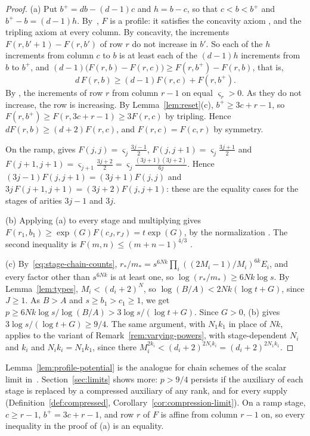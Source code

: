 \begin{proof}
(a) Put \(b^+=db-(d-1)c\) and \(h=b-c\), so that \(c<b<b^+\) and
\(b^+-b=(d-1)h\). By~\citep[Theorem~3.2]{FinCon26}, \(F\) is a profile:
it satisfies the concavity axiom \citep[(3.2)]{FinCon26}, and the
tripling axiom \citep[(3.3)]{FinCon26} at every column. By
concavity, the increments \(F(r,b'+1)-F(r,b')\) of row \(r\) do not
increase in \(b'\). So each of the \(h\) increments from column \(c\) to
\(b\) is at least each of the \((d-1)h\) increments from \(b\) to
\(b^+\), and \((d-1)\bigl(F(r,b)-F(r,c)\bigr)\ge F(r,b^+)-F(r,b)\), that
is,
\[
 d\,F(r,b)\ge(d-1)F(r,c)+F(r,b^+).
\]
By \citep[(3.5)]{FinCon26}, the increments of row \(r\) from column
\(r-1\) on equal \(\varsigma_r>0\). As they do not increase, the row is
increasing. By Lemma~\ref{lem:reset}(c), \(b^+\ge3c+r-1\), so
\(F(r,b^+)\ge F(r,3c+r-1)\ge3F(r,c)\) by tripling. Hence
\(dF(r,b)\ge(d+2)F(r,c)\), and \(F(r,c)=F(c,r)\) by symmetry.

On the ramp, \citep[(3.4)]{FinCon26} gives
\(F(j,j)=\varsigma_j\frac{3j-1}2\), \(F(j,j+1)=\varsigma_j\frac{3j+1}2\) and
\(F(j+1,j+1)=\varsigma_{j+1}\frac{3j+2}2=\varsigma_j\frac{(3j+1)(3j+2)}{6j}\).
Hence \((3j-1)F(j,j+1)=(3j+1)F(j,j)\) and
\(3j\,F(j+1,j+1)=(3j+2)F(j,j+1)\): these are the equality cases for the
stages of arities \(3j-1\) and \(3j\).

(b) Applying (a) to every stage and multiplying gives
\(F(r_1,b_1)\ge\exp(G)F(c_J,r_J)=t\exp(G)\), by the normalization
\citep[(3.1)]{FinCon26}. The second inequality is
\(F(m,n)\le(m+n-1)^{4/3}\) \citep[(3.6)]{FinCon26}.

(c) By~\eqref{eq:stage-chain-counts},
\(r_*/m_*=s^{6Nk}\prod_i((2M_i-1)/M_i)^{6k}E_i\), and every factor
other than \(s^{6Nk}\) is at least one, so
\(\log(r_*/m_*)\ge6Nk\log s\). By Lemma~\ref{lem:types},
\(M_i<(d_i+2)^N\), so \(\log(B/A)<2Nk(\log t+G)\), since \(J\ge1\).
As \(B>A\) and \(s\ge b_1>c_1\ge1\), we get
\(p\ge6Nk\log s/\log(B/A)>3\log s/(\log t+G)\). Since \(G>0\), (b)
gives \(3\log s/(\log t+G)\ge9/4\). The same argument, with
\(N_1k_1\) in place of \(Nk\), applies to the variant of
Remark~\ref{rem:varying-powers}, with stage-dependent \(N_i\) and
\(k_i\) and \(N_ik_i=N_1k_1\), since there
\(M_i^{2k_i}<(d_i+2)^{2N_ik_i}=(d_i+2)^{2N_1k_1}\).
\end{proof}

Lemma~\ref{lem:profile-potential} is the analogue for chain schemes of
the scalar limit in~\citep[Remark~3.3]{FinCon26}.
Section~\ref{sec:limits} shows more: \(p>9/4\) persists if the auxiliary
of each stage is replaced by a compressed auxiliary of any rank, and for
every supply (Definition~\ref{def:compressed},
Corollary~\ref{cor:compression-limit}).
On a ramp stage, \(c\ge r-1\), \(b^+=3c+r-1\), and row \(r\) of \(F\) is
affine from column \(r-1\) on, so every inequality in the proof of (a)
is an equality.

